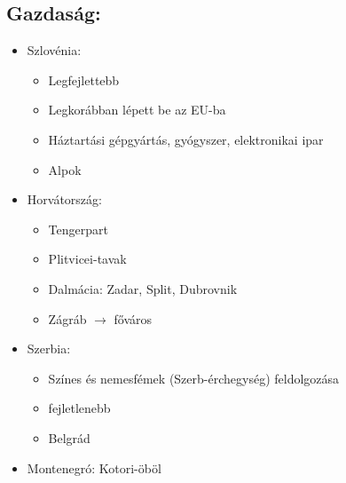 \documentclass{article}
\begin{document}
\subsection{Gazdaság:}
\begin{itemize}
    \item Szlovénia: \begin{itemize}
        \item Legfejlettebb
        \item Legkorábban lépett be az EU-ba
        \item Háztartási gépgyártás, gyógyszer, elektronikai ipar
        \item Alpok
    \end{itemize}
    \item Horvátország: \begin{itemize}
        \item Tengerpart
        \item Plitvicei-tavak 
        \item Dalmácia: Zadar, Split, Dubrovnik
        \item Zágráb $\rightarrow$ főváros
    \end{itemize}
    \item Szerbia: \begin{itemize}
        \item Színes és nemesfémek (Szerb-érchegység) feldolgozása
        \item fejletlenebb
        \item Belgrád
    \end{itemize}
    \item Montenegró: Kotori-öböl
\end{itemize}
\end{document}
